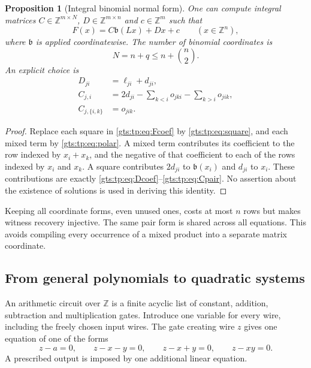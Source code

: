 \documentclass[11pt,letterpaper]{article}
\newtheorem{proposition}[theorem]{Proposition}
\theoremstyle{definition}
\theoremstyle{remark}
\newcommand{\ZZ}{\mathbb Z}
\newcommand{\bn}{\mathfrak b}
\begin{document}
\begin{proposition}[Integral binomial normal form]\label{gts:tp:prop:normal}
One can compute integral matrices $C\in\ZZ^{m\times N}$,
$D\in\ZZ^{m\times n}$ and $c\in\ZZ^m$ such that
\begin{equation}\label{gts:tp:eq:normal}
                  F(x)=C\bn(Lx)+Dx+c
                  \qquad(x\in\ZZ^n),
\end{equation}
where $\bn$ is applied coordinatewise. The number of binomial coordinates is
\[
                 N=n+q\leq n+\binom n2.
\]
An explicit choice is
\begin{align}
 D_{ji}&=\ell_{ji}+d_{ji},\label{gts:tp:eq:Dcoef}\\
 C_{j,i}&=2d_{ji}-\sum_{k<i}o_{jki}-\sum_{k>i}o_{jik},\label{gts:tp:eq:Cunit}\\
 C_{j,\{i,k\}}&=o_{jik}.\label{gts:tp:eq:Cpair}
\end{align}
\end{proposition}
\begin{proof}
Replace each square in \eqref{gts:tp:eq:Fcoef} by \eqref{gts:tp:eq:square}, and each mixed
term by \eqref{gts:tp:eq:polar}. A mixed term contributes its coefficient to the
row indexed by $x_i+x_k$, and the negative of that coefficient to each of
the rows indexed by $x_i$ and $x_k$. A square contributes $2d_{ji}$ to
$\bn(x_i)$ and $d_{ji}$ to $x_i$. These contributions are exactly
\eqref{gts:tp:eq:Dcoef}--\eqref{gts:tp:eq:Cpair}. No assertion about the existence of
solutions is used in deriving this identity.
\end{proof}

Keeping all coordinate forms, even unused ones, costs at most $n$ rows but
makes witness recovery injective. The same pair form is shared across all
equations. This avoids compiling every occurrence of a mixed product into a
separate matrix coordinate.

\subsection{From general polynomials to quadratic systems}
An arithmetic circuit over $\ZZ$ is a finite acyclic list of constant,
addition, subtraction and multiplication gates. Introduce one variable for
every wire, including the freely chosen input wires. The gate creating wire
$z$ gives one equation of one of the forms
\[
 z-a=0,\qquad z-x-y=0,\qquad z-x+y=0,\qquad z-xy=0.
\]
A prescribed output is imposed by one additional linear equation.
\end{document}
